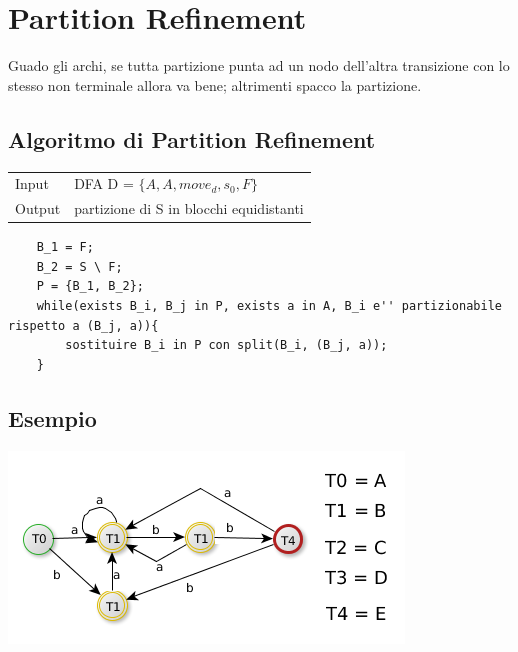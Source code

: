 \section{Partition Refinement}
\begin{tcolorbox}\begin{center}
    Guado gli archi, se tutta partizione punta ad un nodo dell'altra transizione con lo stesso non terminale allora va bene; 
    altrimenti spacco la partizione.
\end{center}\end{tcolorbox}

\subsection{Algoritmo di Partition Refinement}
\begin{center}
    \begin{tabular}{ll}
        Input   &   DFA D = $\{ A,A,move_d, s_0, F\}$\\
        Output  &   partizione di S in blocchi equidistanti\\ 
    \end{tabular}
\end{center}

\begin{lstlisting}
    B_1 = F;
    B_2 = S \ F;
    P = {B_1, B_2};
    while(exists B_i, B_j in P, exists a in A, B_i e'' partizionabile rispetto a (B_j, a)){
        sostituire B_i in P con split(B_i, (B_j, a));
    }
\end{lstlisting}

\subsection{Esempio}

\begin{center}
	\includegraphics[scale=0.5]{Chapters/Img/c02_04.png}\\
\end{center} 

